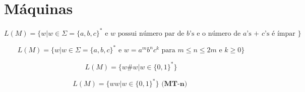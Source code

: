 \documentclass[12pt, a4paper]{article}
\begin{document}



\tableofcontents
\clearpage
\listoffigures
\clearpage



\section{Máquinas}

$$ L(M)= \lbrace w \vert w \in \Sigma =  {\lbrace a,b,c \rbrace}^* \text{ e $w$ possui número par de $b$'s e o número de $a$'s + $c$'s é ímpar } \rbrace$$

$$ L(M)= \lbrace w \vert w \in \Sigma =  {\lbrace a,b,c \rbrace}^* \text{ e } w = {{a}^m}{{b}^n}{{c}^k} \text{ para } m \leqslant n  \leqslant 2m \text{ e } k \geqslant 0 \rbrace $$

$$ L(M)= \lbrace w \# w \vert w \in  {\lbrace 0,1 \rbrace}^* \rbrace $$

$$ L(M)= \lbrace ww \vert w \in  {\lbrace 0,1 \rbrace}^* \rbrace \textbf{ (MT-n) } $$


\end{document}
